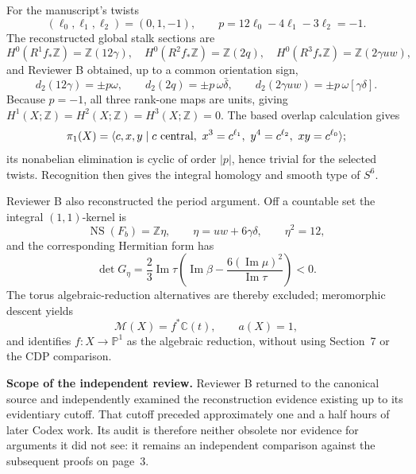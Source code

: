 {\ResultSmall
For the manuscript's twists
\[
 (\ell_0,\ell_1,\ell_2)=(0,1,-1),\qquad
 p=12\ell_0-4\ell_1-3\ell_2=-1.
\]
The reconstructed global stalk sections are
\[
 H^0(R^1f_*\mathbb Z)=\mathbb Z(12\gamma),\quad
 H^0(R^2f_*\mathbb Z)=\mathbb Z(2q),\quad
 H^0(R^3f_*\mathbb Z)=\mathbb Z(2\gamma uw),
\]
and Reviewer B obtained, up to a common orientation sign,
\[
 d_2(12\gamma)=\pm p\omega,\qquad
 d_2(2q)=\pm p\,\omega\bar\delta,\qquad
 d_2(2\gamma uw)=\pm p\,\omega[\gamma\delta].
\]
Because $p=-1$, all three rank-one maps are units, giving
\(H^1(X;\mathbb Z)=H^2(X;\mathbb Z)=H^3(X;\mathbb Z)=0\).  The based
overlap calculation gives
\[
 \pi_1(X)=\langle c,x,y\mid c\ {\rm central},\
 x^3=c^{\ell_1},\ y^4=c^{\ell_2},\ xy=c^{\ell_0}\rangle;
\]
its nonabelian elimination is cyclic of order $|p|$, hence trivial for
the selected twists.  Recognition then gives the integral homology and
smooth type of $S^6$.
}

{\ResultSmall
Reviewer B also reconstructed the period argument.  Off a countable set the
integral $(1,1)$-kernel is
\[
 \operatorname{NS}(F_b)=\mathbb Z\eta,\qquad
 \eta=uw+6\gamma\delta,\qquad \eta^2=12,
\]
and the corresponding Hermitian form has
\[
 \det G_\eta=\frac23\operatorname{Im}\tau
 \left(\operatorname{Im}\beta-
 \frac{6(\operatorname{Im}\mu)^2}{\operatorname{Im}\tau}\right)<0.
\]
The torus algebraic-reduction alternatives are thereby excluded; meromorphic
descent yields
\[
 \mathcal M(X)=f^*\mathbb C(t),\qquad a(X)=1,
\]
and identifies $f:X\to\mathbb P^1$ as the algebraic reduction, without
using Section~7 or the CDP comparison.
}

\vfill
{\fontsize{6.7pt}{7.65pt}\selectfont\color{AuditProvenance}
\textbf{Scope of the independent review.} Reviewer B returned to the
canonical source and independently examined the reconstruction evidence
existing up to its evidentiary cutoff.  That cutoff preceded approximately
one and a half hours of later Codex work.  Its audit is therefore neither
obsolete nor evidence for arguments it did not see: it remains an
independent comparison against the subsequent proofs on page~3.}
\endgroup

\newpage
\thispagestyle{empty}
\begingroup
\raggedright
\setlength{\parindent}{0pt}
\setlength{\parskip}{0pt}
\setlength{\fboxsep}{5pt}
\newcommand{\ResultHead}[1]{\par\vspace{3.7pt}{\fontsize{9.2pt}{10.3pt}\selectfont\bfseries\color{AuditReviewed}#1}\par\vspace{1.3pt}}
\newcommand{\ResultSmall}{\fontsize{8.15pt}{9.42pt}\selectfont}

